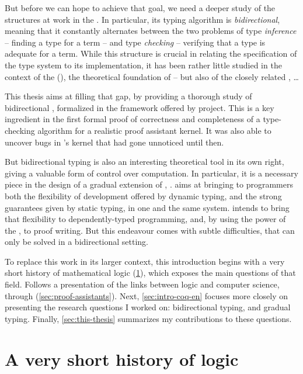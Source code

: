 But before we can hope to achieve that goal, we need a deeper study of the structures at work
in the . In particular, its typing algorithm is \emph{bidirectional}, meaning that
it constantly alternates between the two problems of type \emph{inference} –
finding a type for a term – and type \emph{checking} –
verifying that a type is adequate for a term. While this
structure is crucial in relating the specification of the type system to its implementation,
it has been rather little studied in the context of the
 (),
the theoretical foundation of  – but also of the closely related
, …

This thesis aims at filling that gap, by providing a thorough study of bidirectional ,
formalized in the framework offered by  project. This is a key
ingredient in the first formal proof of correctness and completeness of a type-checking
algorithm for a realistic proof assistant kernel.
It was also able to uncover bugs in ’s kernel that had gone unnoticed until then.

But bidirectional typing is also an interesting theoretical tool in its own right,
giving a valuable form of control over computation.
In particular, it is a necessary piece in the design of a gradual extension of
, .
 aims at bringing to programmers both the flexibility of
development offered by dynamic typing, and the strong guarantees given
by static typing, in one and the same system.  intends
to bring that flexibility to dependently-typed programming,
and, by using the power of the , to proof writing.
But this endeavour comes with subtle difficulties,
that can only be solved in a bidirectional setting.

To replace this work in its larger context, this introduction begins with a very
short history of mathematical logic (\cref{sec:logic-history}), which exposes the
main questions of that field. Follows a presentation of the links between logic and
computer science, through  (\cref{sec:proof-assistants}).
Next, \cref{sec:intro-coq-en} focuses more closely on presenting
the research questions I worked on: bidirectional typing,  and gradual typing.
Finally, \cref{sec:this-thesis} summarizes my contributions to these questions.

\section{A very short history of logic}
\label{sec:logic-history}

